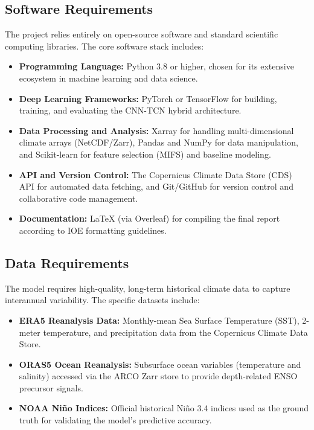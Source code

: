 \subsection{Software Requirements}

The project relies entirely on open-source software and standard scientific computing libraries. The core software stack includes:
\begin{itemize}
    \item \textbf{Programming Language:} Python 3.8 or higher, chosen for its extensive ecosystem in machine learning and data science.
    \item \textbf{Deep Learning Frameworks:} PyTorch or TensorFlow for building, training, and evaluating the CNN-TCN hybrid architecture.
    \item \textbf{Data Processing and Analysis:} Xarray for handling multi-dimensional climate arrays (NetCDF/Zarr), Pandas and NumPy for data manipulation, and Scikit-learn for feature selection (MIFS) and baseline modeling.
    \item \textbf{API and Version Control:} The Copernicus Climate Data Store (CDS) API for automated data fetching, and Git/GitHub for version control and collaborative code management.
    \item \textbf{Documentation:} \LaTeX{} (via Overleaf) for compiling the final report according to IOE formatting guidelines.
\end{itemize}

\subsection{Data Requirements}

The model requires high-quality, long-term historical climate data to capture interannual variability. The specific datasets include:
\begin{itemize}
    \item \textbf{ERA5 Reanalysis Data:} Monthly-mean Sea Surface Temperature (SST), 2-meter temperature, and precipitation data from the Copernicus Climate Data Store.
    \item \textbf{ORAS5 Ocean Reanalysis:} Subsurface ocean variables (temperature and salinity) accessed via the ARCO Zarr store to provide depth-related ENSO precursor signals.
    \item \textbf{NOAA Ni\~{n}o Indices:} Official historical Ni\~{n}o 3.4 indices used as the ground truth for validating the model's predictive accuracy.
\end{itemize}

